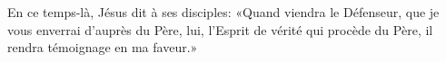 En ce temps-là, Jésus dit à ses disciples:
	«Quand viendra le Défenseur, que je vous enverrai d’auprès du Père,
	lui, l’Esprit de vérité qui procède du Père,
	il rendra témoignage en ma faveur.»
